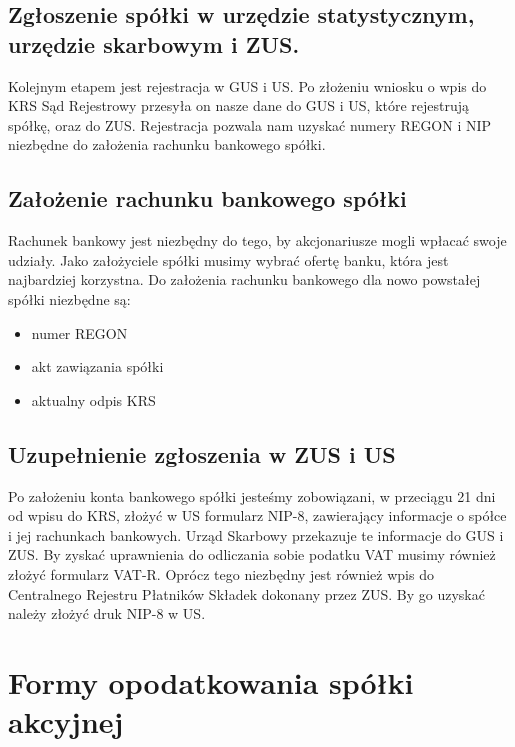 \documentclass[11pt]{article}
\begin{document}
	\subsection{Zgłoszenie spółki w urzędzie statystycznym,  urzędzie skarbowym i ZUS.}
	
	Kolejnym etapem jest rejestracja w GUS i US. Po złożeniu wniosku o wpis do KRS Sąd Rejestrowy przesyła on nasze dane do GUS i US, które rejestrują spółkę, oraz do ZUS. Rejestracja pozwala nam uzyskać numery REGON i NIP niezbędne do założenia rachunku bankowego spółki.
	
	\subsection{Założenie rachunku bankowego spółki}
	
	Rachunek bankowy jest niezbędny do tego, by akcjonariusze mogli wpłacać swoje udziały. Jako założyciele spółki musimy wybrać ofertę banku, która jest najbardziej korzystna. Do założenia rachunku bankowego dla nowo powstałej spółki niezbędne są:
 \begin{itemize}
 	
	\item numer REGON
	\item akt zawiązania spółki
	\item aktualny odpis KRS 	
 	
 \end{itemize}

	\subsection{Uzupełnienie zgłoszenia w ZUS i US}


Po założeniu konta bankowego spółki jesteśmy zobowiązani, w przeciągu 21 dni od wpisu do KRS, złożyć w US formularz NIP-8, zawierający informacje o spółce i jej rachunkach bankowych. Urząd Skarbowy przekazuje te informacje do GUS i ZUS. By zyskać uprawnienia do odliczania sobie podatku VAT musimy również złożyć formularz VAT-R. Oprócz tego niezbędny jest również wpis do Centralnego Rejestru Płatników Składek dokonany przez ZUS. By go uzyskać należy złożyć druk NIP-8 w US.




	
	\section{Formy opodatkowania spółki akcyjnej}
	
\end{document}
